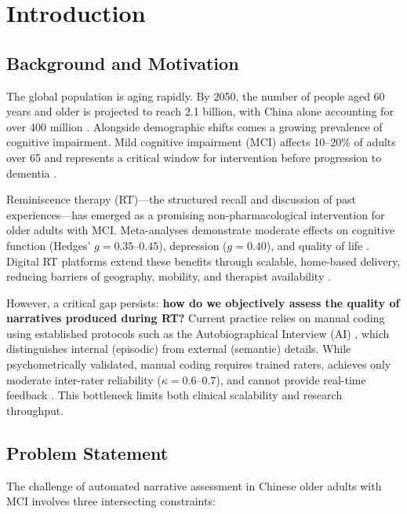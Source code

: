 \documentclass[11pt]{article}
\begin{document}

\section{Introduction}

\subsection{Background and Motivation}

The global population is aging rapidly. By 2050, the number of people aged 60 years and older is projected to reach 2.1 billion, with China alone accounting for over 400 million \citep{un2024}. Alongside demographic shifts comes a growing prevalence of cognitive impairment. Mild cognitive impairment (MCI) affects 10--20\% of adults over 65 and represents a critical window for intervention before progression to dementia \citep{petersen2016}.

Reminiscence therapy (RT)---the structured recall and discussion of past experiences---has emerged as a promising non-pharmacological intervention for older adults with MCI. Meta-analyses demonstrate moderate effects on cognitive function (Hedges' $g = 0.35$--$0.45$), depression ($g = 0.40$), and quality of life \citep{pu2025, ni2026}. Digital RT platforms extend these benefits through scalable, home-based delivery, reducing barriers of geography, mobility, and therapist availability \citep{wang2026}.

However, a critical gap persists: \textbf{how do we objectively assess the quality of narratives produced during RT?} Current practice relies on manual coding using established protocols such as the Autobiographical Interview (AI) \citep{levine2002}, which distinguishes internal (episodic) from external (semantic) details. While psychometrically validated, manual coding requires trained raters, achieves only moderate inter-rater reliability ($\kappa = 0.6$--$0.7$), and cannot provide real-time feedback \citep{spencer2020}. This bottleneck limits both clinical scalability and research throughput.

\subsection{Problem Statement}

The challenge of automated narrative assessment in Chinese older adults with MCI involves three intersecting constraints:
\end{document}
